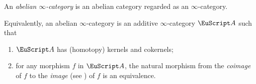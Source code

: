 \begin{definition}\label{df:abelinfty}
An \emph{abelian $\infty$-category}  is an abelian
category regarded as an $\infty$-category.
\end{definition}
\begin{remark}
Equivalently, an abelian $\infty$-category is an additive $\infty$-category $\cate{A}$
such that
\begin{enumerate}[label=$\roman*$)]
\item $\cate{A}$ has (homotopy) kernels and cokernels;
\item for any morphism $f$ in $\cate{A}$, the natural morphism from the \emph{coimage} of $f$ to the \emph{image} (see \adef{}) of $f$ is an equivalence.
\end{enumerate}
\end{remark}

